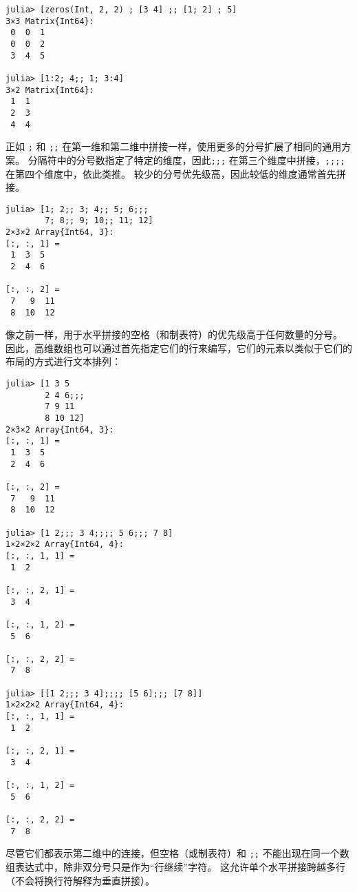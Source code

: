 \begin{verbatim}
julia> [zeros(Int, 2, 2) ; [3 4] ;; [1; 2] ; 5]
3×3 Matrix{Int64}:
 0  0  1
 0  0  2
 3  4  5

julia> [1:2; 4;; 1; 3:4]
3×2 Matrix{Int64}:
 1  1
 2  3
 4  4
\end{verbatim}



正如 \texttt{;} 和 \texttt{;;} 在第一维和第二维中拼接一样，使用更多的分号扩展了相同的通用方案。 分隔符中的分号数指定了特定的维度，因此\texttt{;;;} 在第三个维度中拼接，\texttt{;;;;} 在第四个维度中，依此类推。 较少的分号优先级高，因此较低的维度通常首先拼接。




\begin{verbatim}
julia> [1; 2;; 3; 4;; 5; 6;;;
        7; 8;; 9; 10;; 11; 12]
2×3×2 Array{Int64, 3}:
[:, :, 1] =
 1  3  5
 2  4  6

[:, :, 2] =
 7   9  11
 8  10  12
\end{verbatim}



像之前一样，用于水平拼接的空格（和制表符）的优先级高于任何数量的分号。 因此，高维数组也可以通过首先指定它们的行来编写，它们的元素以类似于它们的布局的方式进行文本排列：




\begin{verbatim}
julia> [1 3 5
        2 4 6;;;
        7 9 11
        8 10 12]
2×3×2 Array{Int64, 3}:
[:, :, 1] =
 1  3  5
 2  4  6

[:, :, 2] =
 7   9  11
 8  10  12

julia> [1 2;;; 3 4;;;; 5 6;;; 7 8]
1×2×2×2 Array{Int64, 4}:
[:, :, 1, 1] =
 1  2

[:, :, 2, 1] =
 3  4

[:, :, 1, 2] =
 5  6

[:, :, 2, 2] =
 7  8

julia> [[1 2;;; 3 4];;;; [5 6];;; [7 8]]
1×2×2×2 Array{Int64, 4}:
[:, :, 1, 1] =
 1  2

[:, :, 2, 1] =
 3  4

[:, :, 1, 2] =
 5  6

[:, :, 2, 2] =
 7  8
\end{verbatim}



尽管它们都表示第二维中的连接，但空格（或制表符）和 \texttt{;;} 不能出现在同一个数组表达式中，除非双分号只是作为“行继续”字符。 这允许单个水平拼接跨越多行（不会将换行符解释为垂直拼接）。




